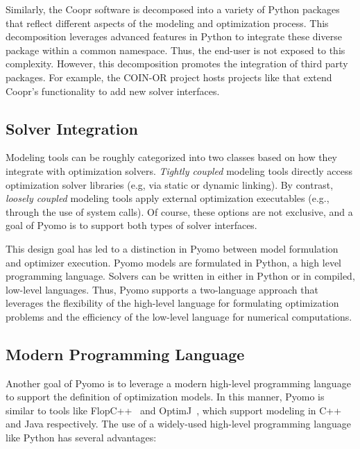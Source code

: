 Similarly, the Coopr software is decomposed into a variety of Python
packages that reflect different aspects of the modeling and optimization
process.  This decomposition leverages advanced features in Python to
integrate these diverse package within a common  namespace.
Thus, the end-user is not exposed to this complexity.  However,
this decomposition promotes the integration of third party packages.
For example, the COIN-OR  project hosts projects like
 that extend Coopr's functionality to add new solver
interfaces.


\subsection{Solver Integration}

Modeling tools can be roughly categorized into two classes based on
how they integrate with optimization solvers. {\em Tightly coupled}
modeling tools directly access optimization solver libraries (e.g, via
static or dynamic linking). By contrast, {\em loosely coupled}
modeling tools apply external optimization executables (e.g., through
the use of system calls).  Of course, these options are not exclusive,
and a goal of Pyomo is to support both types of solver interfaces.

This design goal has led to a distinction in Pyomo between model
formulation and optimizer execution.  Pyomo models are formulated in
Python, a high level programming language.  Solvers can be written in
either in Python or in compiled, low-level languages.  Thus, Pyomo
supports a two-language approach that leverages the flexibility of
the high-level language for formulating optimization problems and the
efficiency of the low-level language for numerical computations.


\subsection{Modern Programming Language}

Another goal of Pyomo is to leverage a modern high-level programming
language to support the definition of optimization models.  In this
manner, Pyomo is similar to tools like FlopC++~\citep{flopcpp}
and OptimJ~\citep{OptimJ}, which support modeling in C++ and Java
respectively.  The use of a widely-used high-level programming language
like Python has several advantages:

